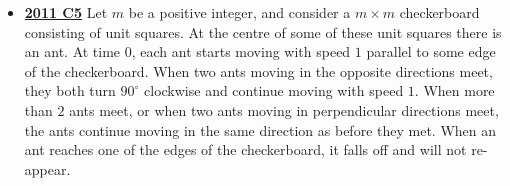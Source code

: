 \documentclass[11pt]{scrartcl}
\begin{document}
\begin{itemize}[leftmargin=*]
    Prove that it is possible to permute the tokens so that each token is moved to a distance of at most $d+2$ from its original position, and each square contains a token with the same color as the square.
    \item \href{https://artofproblemsolving.com/community/c6h488628p2738017}{\textbf{2011 C5}} Let $m$ be a positive integer, and consider a $m\times m$ checkerboard consisting of unit squares. At the centre of some of these unit squares there is an ant. At time $0$, each ant starts moving with speed $1$ parallel to some edge of the checkerboard. When two ants moving in the opposite directions meet, they both turn $90^{\circ}$ clockwise and continue moving with speed $1$. When more than $2$ ants meet, or when two ants moving in perpendicular directions meet, the ants continue moving in the same direction as before they met. When an ant reaches one of the edges of the checkerboard, it falls off and will not re-appear.


\end{itemize}
\end{document}
